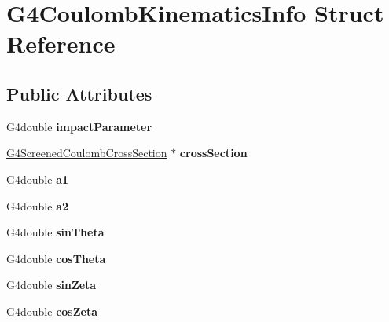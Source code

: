 \hypertarget{structG4CoulombKinematicsInfo}{\section{G4\-Coulomb\-Kinematics\-Info Struct Reference}
\label{structG4CoulombKinematicsInfo}
}
\subsection*{Public Attributes}
\begin{DoxyCompactItemize}
\item 
\hypertarget{structG4CoulombKinematicsInfo_ab622631d2d7c5378fd1e4d5ae4260d18}{G4double {\bfseries impact\-Parameter}}\label{structG4CoulombKinematicsInfo_ab622631d2d7c5378fd1e4d5ae4260d18}

\item 
\hypertarget{structG4CoulombKinematicsInfo_a98f207760b06d9ec24aafb5c4a499c7a}{\hyperlink{classG4ScreenedCoulombCrossSection}{G4\-Screened\-Coulomb\-Cross\-Section} $\ast$ {\bfseries cross\-Section}}\label{structG4CoulombKinematicsInfo_a98f207760b06d9ec24aafb5c4a499c7a}

\item 
\hypertarget{structG4CoulombKinematicsInfo_a2839f2c5bafd5b6a973e373926087452}{G4double {\bfseries a1}}\label{structG4CoulombKinematicsInfo_a2839f2c5bafd5b6a973e373926087452}

\item 
\hypertarget{structG4CoulombKinematicsInfo_a26c1bd40834fbab683db450f165ce31a}{G4double {\bfseries a2}}\label{structG4CoulombKinematicsInfo_a26c1bd40834fbab683db450f165ce31a}

\item 
\hypertarget{structG4CoulombKinematicsInfo_aed45cd5ea80dd02228b0b46b51f26325}{G4double {\bfseries sin\-Theta}}\label{structG4CoulombKinematicsInfo_aed45cd5ea80dd02228b0b46b51f26325}

\item 
\hypertarget{structG4CoulombKinematicsInfo_a4b434e3e3c9dddcf949db7838fd227f9}{G4double {\bfseries cos\-Theta}}\label{structG4CoulombKinematicsInfo_a4b434e3e3c9dddcf949db7838fd227f9}

\item 
\hypertarget{structG4CoulombKinematicsInfo_a98dcd19b562beeb8d8b4f3345b9a9a8a}{G4double {\bfseries sin\-Zeta}}\label{structG4CoulombKinematicsInfo_a98dcd19b562beeb8d8b4f3345b9a9a8a}

\item 
\hypertarget{structG4CoulombKinematicsInfo_aaf59256e97f3d630a063d1f8d8294e42}{G4double {\bfseries cos\-Zeta}}\label{structG4CoulombKinematicsInfo_aaf59256e97f3d630a063d1f8d8294e42}


\end{DoxyCompactItemize}
